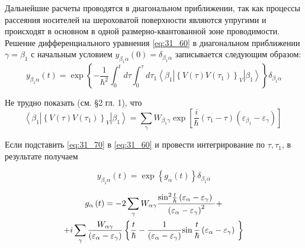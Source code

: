 \noindent Дальнейшие расчеты проводятся в диагональном приближении, так как процессы рассеяния носителей на шероховатой поверхности являются упругими и происходят в основном в одной размерно-квантованной зоне проводимости. Решение дифференциального уравнения \eqref{eq:31_60} в диагональном приближении $\gamma ={\beta }_1$ с начальным условием $y_{{\beta }_1\alpha }\left(0\right)={\delta }_{{\beta }_1\alpha }$ записывается следующим образом:
\begin{equation} \label{eq:31_70}
y_{{\beta }_1\alpha }\left(t\right)=\exp \left\{-\frac{1}{{\hbar }^2}\int^t_0{d \tau \int^{\tau }_0{d {\tau }_1\left\langle {\beta }_1\left|{\left\{V\left(\tau \right)V\left({\tau }_1\right)\right\}}_V\right|{\beta }_1\right\rangle }}\right\}{\delta }_{{\beta }_1\alpha }
\end{equation} 

\noindent Не трудно показать (см. \S 2 гл. 1), что
\begin{equation} \label{eq:31_80}
\left\langle {\beta }_1\left|{\left\{V\left(\tau \right)V\left({\tau }_1\right)\right\}}_V\right|{\beta }_1\right\rangle =\sum_{\gamma }{W_{{\beta }_1\gamma }\exp \left[\frac{i}{\hbar }\left({\tau }_1-\tau \right)\left({\varepsilon }_{{\beta }_1}-{\varepsilon }_{\gamma }\right)\right]\ }
\end{equation} 

\noindent Если подставить \eqref{eq:31_70} в \eqref{eq:31_60} и провести интегрирование по $\tau ,{\tau }_1$, в результате получаем

\begin{equation} \label{eq:31_90}
y_{{\beta }_1\alpha }\left(t\right)=\exp \left\{g_{\alpha }\left(t\right)\right\}{\delta }_{{\beta }_1\alpha}
\end{equation}

\begin{multline} \label{eq:31_100}
g_{\alpha }\left(t\right)=-2\sum_{\gamma }{W_{\alpha \gamma }\frac{{{\sin}^2 \frac{t}{\hbar }\left({\varepsilon }_{\alpha }-{\varepsilon }_{\gamma }\right)\ }}{{\left({\varepsilon }_{\alpha }-{\varepsilon }_{\gamma }\right)}^2}}+\\
+i\sum_{\gamma }{\frac{W_{\alpha \gamma }}{\left({\varepsilon }_{\alpha }-{\varepsilon }_{\gamma }\right)}}\left\{\frac{t}{\hbar }-\frac{1}{\left({\varepsilon }_{\alpha }-{\varepsilon }_{\gamma }\right)}{\sin \frac{t}{\hbar }\left({\varepsilon }_{\alpha }-{\varepsilon }_{\gamma }\right)\ }\right\} \notag	
\end{multline}

